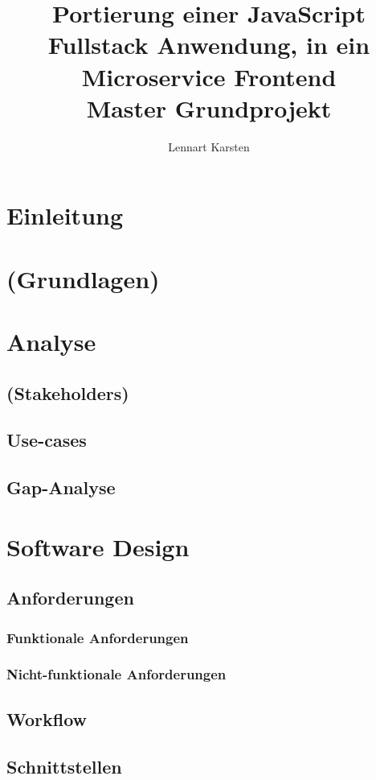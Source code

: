 \documentclass[11pt,a4paper]{article}
\author{Lennart Karsten}
\title{Portierung einer JavaScript Fullstack Anwendung, in ein Microservice Frontend\\
	\vspace{3mm}\large Master Grundprojekt
}
\date{}
\begin{document}
	\maketitle
	\tableofcontents
	\newpage
	
	
	\section{Einleitung}
	
	\section{(Grundlagen)}
	
	\section{Analyse}
	\subsection{(Stakeholders)}
	\subsection{Use-cases}
	\subsection{Gap-Analyse}
	
	\section{Software Design}
	\subsection{Anforderungen}
	\subsubsection{Funktionale Anforderungen}
	\subsubsection{Nicht-funktionale Anforderungen}
	\subsection{Workflow}
	\subsection{Schnittstellen}
	
\end{document}
